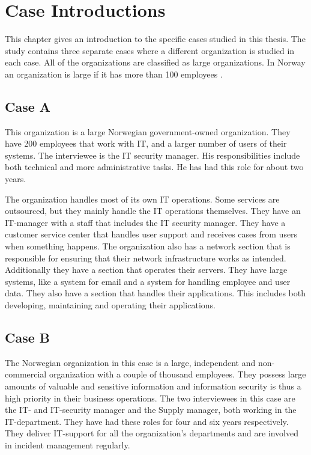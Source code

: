 \chapter{Case Introductions}
\label{chp:CaseIntroductions}
This chapter gives an introduction to the specific cases studied in this thesis. The study contains three separate cases where a different organization is studied in each case. All of the organizations are classified as large organizations. In Norway an organization is large if it has more than 100 employees \cite{SMB}.

\section{Case A}
This organization is a large Norwegian government-owned organization. They have 200 employees that work with IT, and a larger number of users of their systems. The interviewee is the IT security manager. His responsibilities include both technical and more administrative tasks. He has had this role for about two years.

The organization handles most of its own IT operations. Some services are outsourced, but they mainly handle the IT operations themselves. They have an IT-manager with a staff that includes the IT security manager. They have a customer service center %
that handles user support and receives cases from users when something happens. The organization also has a network section that is responsible for ensuring that their network infrastructure works as intended. Additionally they have  a section that operates their servers. They have large systems, like a system for email and a system for handling employee and user data. They also have a section that handles their applications. This includes both developing, maintaining and operating their applications.

\section{Case B}
The Norwegian organization in this case is a large, independent and non-commercial organization with a couple of thousand employees. They possess large amounts of valuable and sensitive information and information security is thus a high priority in their business operations. The two interviewees in this case are the IT- and IT-security manager and the Supply manager, both working in the IT-department. They have had these roles for four and six years respectively. They deliver IT-support for all the organization's departments and are involved in incident management regularly.   

